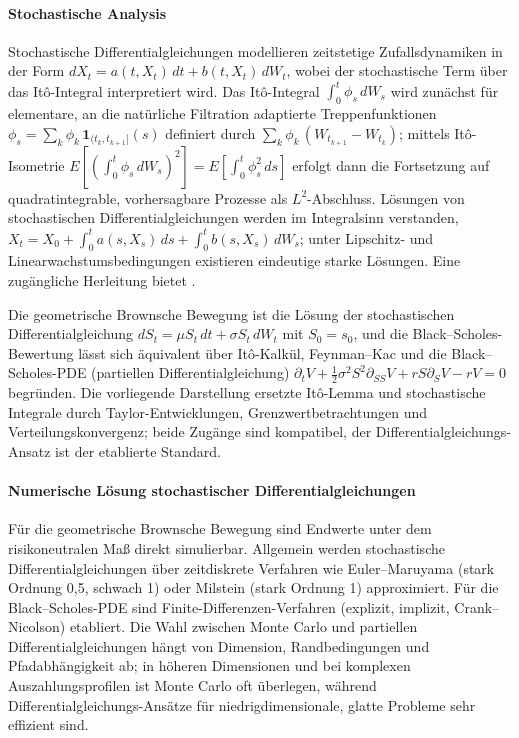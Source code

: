 \paragraph{Stochastische Analysis}
Stochastische Differentialgleichungen modellieren zeitstetige Zufallsdynamiken in der 
Form $dX_t = a(t,X_t)\,dt + b(t,X_t)\,dW_t$, wobei der stochastische Term über das It\^o-Integral interpretiert wird.
Das It\^o-Integral $\int_0^t \phi_s\,dW_s$ wird zunächst für elementare, an die natürliche Filtration adaptierte 
Treppenfunktionen $\phi_s = \sum_k \phi_k\,\mathbf{1}_{(t_k,t_{k+1}]}(s)$ definiert durch $\sum_k \phi_k\,(W_{t_{k+1}}-W_{t_k})$; 
mittels It\^o-Isometrie $E\!\left[\left(\int_0^t \phi_s\,dW_s\right)^2\right] = E\!\left[\int_0^t \phi_s^2\,ds\right]$ erfolgt dann die 
Fortsetzung auf quadratintegrable, vorhersagbare Prozesse als $L^2$-Abschluss. Lösungen von stochastischen Differentialgleichungen werden im Integralsinn 
verstanden, $X_t = X_0 + \int_0^t a(s,X_s)\,ds + \int_0^t b(s,X_s)\,dW_s$; 
unter Lipschitz- und Linearwachstumsbedingungen existieren eindeutige starke Lösungen. Eine zugängliche
Herleitung bietet \cite{behrends}.

Die geometrische Brownsche Bewegung ist die Lösung der stochastischen Differentialgleichung
$dS_t=\mu S_t\,dt+\sigma S_t\,dW_t$ mit $S_0=s_0$,
und die Black–Scholes-Bewertung lässt sich äquivalent über It\^o-Kalkül, Feynman–Kac und die Black–Scholes-PDE (partiellen Differentialgleichung)
$\partial_t V+\tfrac12\sigma^2 S^2 \partial_{SS}V + r S \partial_S V - r V=0$
begründen. Die vorliegende Darstellung ersetzte It\^o-Lemma und stochastische Integrale durch Taylor-Entwicklungen, Grenzwertbetrachtungen und 
Verteilungskonvergenz; beide Zugänge sind kompatibel, der Differentialgleichungs-Ansatz ist der etablierte Standard. 

\paragraph{Numerische Lösung stochastischer Differentialgleichungen}
Für die geometrische Brownsche Bewegung sind Endwerte unter dem risikoneutralen Maß direkt simulierbar. Allgemein werden stochastische Differentialgleichungen über 
zeitdiskrete Verfahren wie Euler–Maruyama (stark Ordnung 0{,}5, schwach 1) oder 
Milstein (stark Ordnung 1) approximiert. Für die Black–Scholes-PDE sind 
Finite-Differenzen-Verfahren (explizit, implizit, Crank–Nicolson) etabliert. Die Wahl zwischen 
Monte Carlo und partiellen Differentialgleichungen hängt von Dimension, Randbedingungen und Pfadabhängigkeit ab; in höheren 
Dimensionen und bei komplexen Auszahlungsprofilen ist Monte Carlo oft überlegen, während 
Differentialgleichungs-Ansätze für niedrigdimensionale, glatte Probleme sehr effizient sind.

